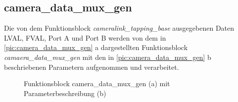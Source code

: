 \documentclass[ngerman,12pt]{article} %
\begin{document}
{\subsection{camera\_data\_mux\_gen}
\label{sec:camera_data_mux_gen}
Die von dem Funktionsblock \textit{cameralink\_tapping\_base} ausgegebenen Daten LVAL, FVAL, Port A und Port B werden von dem in \autoref{pic:camera_data_mux_gen} a dargestellten Funktionsblock \textit{camaera\_data\_mux\_gen} mit den in \autoref{pic:camera_data_mux_gen} b beschriebenen Parametern aufgenommen und verarbeitet.\newline

\begin{figure}[h!tb]
  \centering
  \qquad
  \caption[Funktionsblock camera\_data\_mux\_gen mit Parameterbeschreibung]{\label{pic:camera_data_mux_gen}Funktionsblock camera\_data\_mux\_gen (a) mit Parameterbeschreibung (b)}
\end{figure}

}
\end{document}
